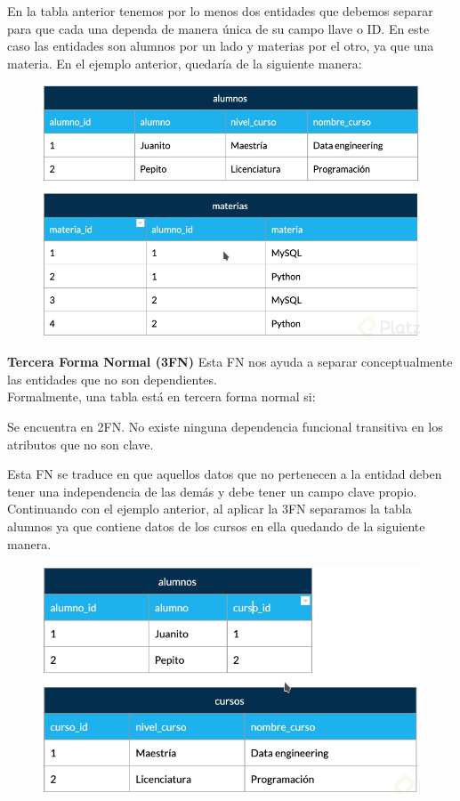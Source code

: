 \documentclass{article}
\begin{document}
En la tabla anterior tenemos por lo menos dos entidades que debemos separar
para que cada una dependa de manera única de su campo llave o ID. En este caso
las entidades son alumnos por un lado y materias por el otro, ya que una
materia. En el ejemplo anterior, quedaría de la siguiente manera:

\newpage

\begin{figure}[h!]
    \centering
      \includegraphics[scale=0.5]{./Pictures/030_normalizacion.png}
\end{figure}

\textbf{Tercera Forma Normal (3FN)}
Esta FN nos ayuda a separar conceptualmente las entidades que no son
dependientes.\\

Formalmente, una tabla está en tercera forma normal si:

Se encuentra en 2FN. No existe ninguna dependencia funcional transitiva en los
atributos que no son clave.

Esta FN se traduce en que aquellos datos que no pertenecen a la entidad deben
tener una independencia de las demás y debe tener un campo clave propio.
Continuando con el ejemplo anterior, al aplicar la 3FN separamos la tabla
alumnos ya que contiene datos de los cursos en ella quedando de la siguiente
manera.

\begin{figure}[h!]
    \centering
      \includegraphics[scale=0.5]{./Pictures/031_normalizacion.png}
\end{figure}
\end{document}

